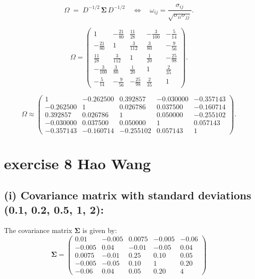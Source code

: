 \documentclass{article}
\let\normalSigma\Sigma
\renewcommand{\Sigma}{\bm{\normalSigma}} %
\begin{document}
\[
    \Omega \;=\; D^{-1/2}\,\Sigma\,D^{-1/2}
    \quad\Longleftrightarrow\quad
    \omega_{ij}=\frac{\sigma_{ij}}{\sqrt{\sigma_{ii}\sigma_{jj}}}.
\]

\[
    \Omega =
    \begin{pmatrix}
        1               & -\tfrac{21}{80} & \tfrac{11}{28}  & -\tfrac{3}{100} & -\tfrac{5}{14}  \\
        -\tfrac{21}{80} & 1               & \tfrac{3}{112}  & \tfrac{3}{80}   & -\tfrac{9}{56}  \\
        \tfrac{11}{28}  & \tfrac{3}{112}  & 1               & \tfrac{1}{20}   & -\tfrac{25}{98} \\
        -\tfrac{3}{100} & \tfrac{3}{80}   & \tfrac{1}{20}   & 1               & \tfrac{2}{35}   \\
        -\tfrac{5}{14}  & -\tfrac{9}{56}  & -\tfrac{25}{98} & \tfrac{2}{35}   & 1
    \end{pmatrix}.
\]

\[
    \Omega \approx
    \begin{pmatrix}
        1         & -0.262500 & 0.392857  & -0.030000 & -0.357143 \\
        -0.262500 & 1         & 0.026786  & 0.037500  & -0.160714 \\
        0.392857  & 0.026786  & 1         & 0.050000  & -0.255102 \\
        -0.030000 & 0.037500  & 0.050000  & 1         & 0.057143  \\
        -0.357143 & -0.160714 & -0.255102 & 0.057143  & 1
    \end{pmatrix}.
\]


\section{exercise 8 Hao Wang}

\subsection*{(i) Covariance matrix with standard deviations (0.1, 0.2, 0.5, 1, 2):}

The covariance matrix \(\Sigma\) is given by:
\[
    \Sigma = \begin{pmatrix}
        0.01   & -0.005 & 0.0075 & -0.005 & -0.06 \\
        -0.005 & 0.04   & -0.01  & -0.05  & 0.04  \\
        0.0075 & -0.01  & 0.25   & 0.10   & 0.05  \\
        -0.005 & -0.05  & 0.10   & 1      & 0.20  \\
        -0.06  & 0.04   & 0.05   & 0.20   & 4
    \end{pmatrix}
\]
\end{document}
